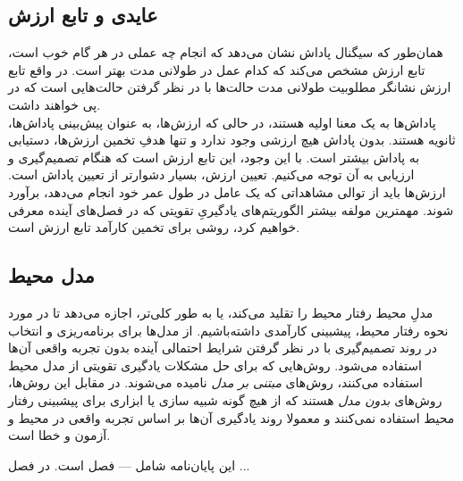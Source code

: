 
\subsection{عایدی و تابع ارزش}
همان‌طور که سیگنال پاداش نشان می‌دهد که انجام چه عملی در هر گام خوب است، تابع ارزش مشخص می‌کند که کدام عمل در طولانی مدت بهتر است. در واقع تابع ارزش نشانگر مطلوبیت طولانی مدت حالت‌ها با در نظر گرفتن حالت‌هایی است که در پی خواهند داشت.
\\پاداش‌ها به یک معنا اولیه هستند، در حالی که ارزش‌ها، به عنوان پیش‌بینی پاداش‌ها، ثانویه هستند. بدون پاداش هیچ ارزشی وجود ندارد و تنها هدفِ تخمین ارزش‌ها، دستیابی به پاداش بیشتر است. با این وجود، این تابع ارزش است که هنگام تصمیم‌گیری و ارزیابی به آن توجه می‌کنیم.
تعیین ارزش،‌ بسیار دشوارتر از تعیین پاداش است.
ارزش‌ها باید از توالی مشاهداتی که یک عامل در طول عمر خود انجام می‌دهد، برآورد شوند.
مهمترین مولفه بیشتر الگوریتم‌های یادگیریِ تقویتی که در  فصل‌های آینده معرفی خواهیم کرد، روشی برای تخمین کارآمد تابع ارزش است.

\subsection{مدل محیط}

مدلِ محیط رفتار محیط را تقلید می‌کند، یا به طور کلی‌تر، اجازه می‌دهد تا در مورد نحوه رفتار محیط، پیشبینی کارآمدی داشته‌باشیم. از مدل‌ها برای برنامه‌ریزی و انتخاب در روند تصمیم‌گیری  با در نظر گرفتن شرایط احتمالی آینده بدون تجربه واقعی آن‌ها استفاده می‌شود.
روش‌هایی که برای حل مشکلات یادگیری تقویتی از مدل‌ محیط استفاده می‌کنند، روش‌های
 \textit{مبتنی بر مدل}
نامیده می‌شوند. در مقابل این روش‌ها، روش‌های 
\textit{بدون مدل}
هستند که از هیچ گونه شبیه سازی  یا ابزاری برای پیشبینی رفتار محیط استفاده نمی‌کنند و معمولا روند یادگیری آن‌ها بر اساس تجربه واقعی در محیط و آزمون و خطا است.




این پایان‌نامه شامل --- فصل است. در فصل ...
